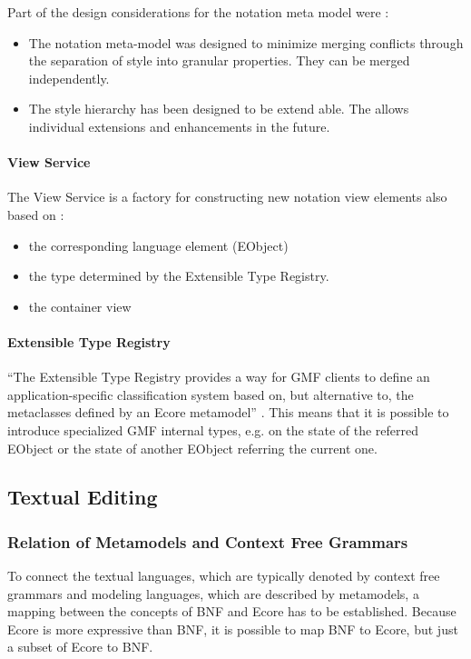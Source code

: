 Part of the design considerations for the notation meta model were \cite{GMFDoc}:
\begin{itemize}
	\item The notation meta-model was designed to minimize merging conflicts through the separation of style into granular properties. They can be merged independently.
	\item The style hierarchy has been designed to be extend able. The allows individual extensions and enhancements in the future. 
\end{itemize}

\paragraph{View Service}
The View Service is a factory for constructing new notation view elements also based on \cite{GMFDoc}:
\begin{itemize}
	\item the corresponding language element (EObject)
	\item the type determined by the Extensible Type Registry.
	\item the container view  
\end{itemize}

\paragraph{Extensible Type Registry}
``The Extensible Type Registry provides a way for GMF clients to define an application-specific classification system based on, but alternative to, the metaclasses defined by an Ecore metamodel'' \cite{GMFDoc}. This means that it is possible to introduce specialized GMF internal types, e.g. on the state of the referred EObject or the state of another EObject referring the current one.










 

\subsection{Textual Editing}



\subsubsection{Relation of Metamodels and Context Free Grammars} \label{sec:MM:CFGs}
To connect the textual languages, which are typically denoted by context free grammars and modeling languages, which are described by metamodels, a mapping between the concepts of BNF and Ecore has to be established. Because Ecore is more expressive than BNF, it is possible to map BNF to Ecore, but just a subset of Ecore to BNF.

